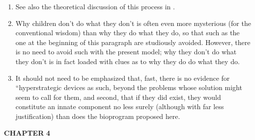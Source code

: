 \begin{enumerate}
\item See also the theoretical discussion of this process in \citet{Bickerton1980}.
\item Why children don't do what they don't is often even more 
mysterious (for the conventional wisdom) than why they do what they do, so that  such as the one at the beginning of this paragraph are studiously avoided. However, there is no need to avoid such  with the present model; why they don't do what they don't is in fact loaded with clues as to why they do do what they do.

\item It should not need to be emphasized that, fast, there is no evidence for ``hyperstrategic devices as such, beyond the problems whose solution might seem to call for them, and second, that if they did exist, they would constitute an innate component no less surely (although with far less justification) than does the bioprogram proposed here.
\end{enumerate}

\textbf{CHAPTER} \textbf{4}


